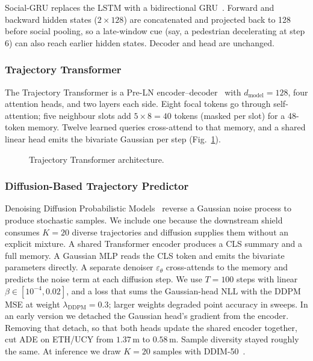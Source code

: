 \documentclass[conference]{IEEEtran}
\begin{document}
Social-GRU replaces the LSTM with a bidirectional
GRU~\cite{cho2014learning,schuster1997bidirectional}.  Forward and
backward hidden states ($2{\times}128$) are concatenated and projected
back to 128 before social pooling, so a late-window cue (say, a
pedestrian decelerating at step 6) can also reach earlier hidden
states.  Decoder and head are unchanged.

\subsubsection{Trajectory Transformer}

The Trajectory Transformer is a Pre-LN
encoder--decoder~\cite{vaswani2017attention,xiong2020layer} with
$d_\text{model}{=}128$, four attention heads, and two layers each
side.  Eight focal tokens go through self-attention; five neighbour
slots add $5\times 8 = 40$ tokens (masked per slot) for a 48-token
memory.  Twelve learned queries cross-attend to that memory, and a
shared linear head emits the bivariate Gaussian per step
(Fig.~\ref{fig:transformer}).

\begin{figure}[t]
  \centering
  \resizebox{0.6\columnwidth}{!}{}
  \caption{Trajectory Transformer architecture.}
  \label{fig:transformer}
\end{figure}

\subsubsection{Diffusion-Based Trajectory Predictor}

Denoising Diffusion Probabilistic Models~\cite{ho2020denoising}
reverse a Gaussian noise process to produce stochastic samples.  We
include one because the downstream shield consumes $K{=}20$ diverse
trajectories and diffusion supplies them without an explicit mixture.
A shared Transformer encoder produces a CLS summary and a full memory.
A Gaussian MLP reads the CLS token and emits the bivariate parameters
directly.  A separate denoiser $\varepsilon_\theta$ cross-attends to
the memory and predicts the noise term at each diffusion step.  We use $T{=}100$ steps with linear
$\beta \in [10^{-4}, 0.02]$, and a loss that sums the Gaussian-head NLL
with the DDPM MSE at weight $\lambda_\text{DDPM}{=}0.3$; larger weights
degraded point accuracy in sweeps.  In an early version we detached the Gaussian head's gradient from the
encoder.  Removing that detach, so that both heads update the shared
encoder together, cut ADE on ETH/UCY from $1.37$\,m to $0.58$\,m.
Sample diversity stayed roughly the same.  At
inference we draw $K=20$ samples with DDIM-50~\cite{song2021denoising}.
\end{document}
